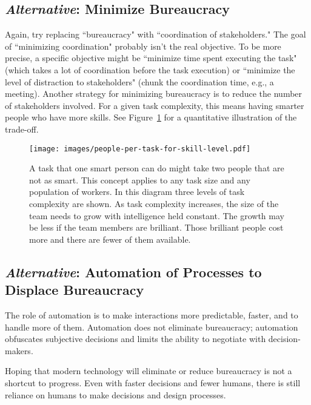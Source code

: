 \subsection*{\textit{Alternative}: Minimize Bureaucracy}
Again, try replacing ``bureaucracy" with ``coordination of stakeholders." The goal of ``minimizing coordination" probably isn't the real objective. To be more precise, a specific objective might be ``minimize time spent executing the task" (which takes a lot of coordination before the task execution) or ``minimize the level of distraction to stakeholders" (chunk the coordination time, e.g., a meeting). Another strategy for minimizing bureaucracy is to reduce the number of stakeholders involved. For a given task complexity, this means having smarter people who have more skills. See Figure~\ref{fig:complexity-and-size} for a quantitative illustration of the trade-off. 


\begin{figure}
\centering
\texttt{[image: images/people-per-task-for-skill-level.pdf]}
\caption{A task that one smart person can do might take two  people that are not as smart. This concept applies to any task size and any population of workers. In this diagram three levels of task complexity are shown. As task complexity increases, the size of the team needs to grow with intelligence held constant. The growth may be less if the team members are brilliant. Those brilliant people cost more and there are fewer of them available.}
\label{fig:complexity-and-size}
\end{figure}


\subsection*{\textit{Alternative}: Automation of Processes to Displace Bureaucracy\label{sec:automation}}

The role of automation is to make interactions more predictable, faster, and to handle more of them. Automation does not eliminate bureaucracy; automation obfuscates  subjective decisions and limits the ability to negotiate with decision-makers.

Hoping that modern technology will eliminate or reduce bureaucracy is not a shortcut to progress. 
Even with faster decisions and fewer humans, there is still reliance on humans to make decisions and design processes.

